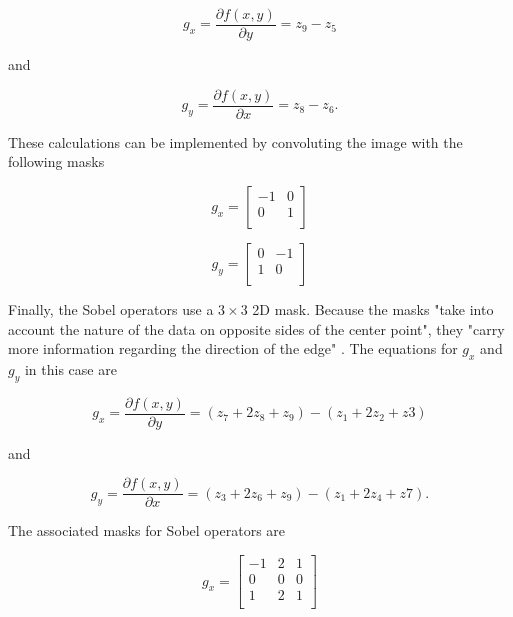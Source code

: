 \begin{equation}
    \label{eq:roberts_operators_x}
    g_x = \frac{\partial f(x,y)}{\partial y} = z_9 - z_5
\end{equation}

and

\begin{equation}
    \label{eq:roberts_operators_y}
    g_y = \frac{\partial f(x,y)}{\partial x} = z_8 - z_6.
\end{equation}

These calculations can be implemented by convoluting the image with the following masks

\begin{equation}
    g_x = \begin{bmatrix}
        -1 & 0 \\
        0 & 1 \\
    \end{bmatrix}
\end{equation}

\begin{equation}
    g_y = \begin{bmatrix}
        0 & -1 \\
        1 & 0 \\
    \end{bmatrix}
\end{equation}

Finally, the Sobel operators use a $3\times 3$ 2D mask. Because the masks "take into account the nature of the data on opposite sides of the center point", they "carry more information regarding the direction of the edge" \cite{Gonzalez2008_digital_image_processing}. The equations for $g_x$ and $g_y$ in this case are

\begin{equation}
    \label{eq:roberts_operators_x}
    g_x = \frac{\partial f(x,y)}{\partial y} = (z_7 + 2z_8 + z_9) - (z_1 + 2z_2 + z3)
\end{equation}

and

\begin{equation}
    \label{eq:roberts_operators_y}
    g_y = \frac{\partial f(x,y)}{\partial x} = (z_3 + 2z_6 + z_9) - (z_1 + 2z_4 + z7).
\end{equation}

The associated masks for Sobel operators are

\begin{equation}
    g_x = \begin{bmatrix}
        -1 & 2 & 1 \\
        0 & 0 & 0 \\
        1 & 2 & 1 \\
    \end{bmatrix}
\end{equation}

